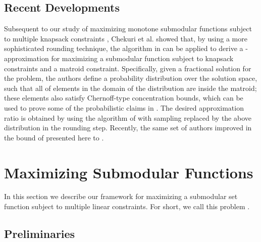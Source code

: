 \documentclass[11pt]{article}
\newcommand{\comment}[1]{}
\begin{document}
{\subsection{Recent Developments}

Subsequent to our study of maximizing monotone submodular
functions subject to multiple knapsack constraints \cite{KST09},
Chekuri et al. \cite{CVZ10}
showed that, by using a more
sophisticated rounding technique,
the algorithm in
\cite{KST09} can be applied to derive a
-approximation for
maximizing a submodular function subject to  knapsack
constraints and a matroid constraint.
Specifically, given a fractional solution for the problem, the
authors
define a probability distribution over the solution space, such
that all of elements in the domain of the distribution are inside
the matroid; these elements also satisfy Chernoff-type
concentration bounds, which can be used to prove some of the
probabilistic claims in \cite{KST09}.
The desired approximation ratio is obtained by using the algorithm
of \cite{KST09} with sampling replaced by the above distribution
in the rounding step.
Recently, the same set of authors improved in \cite{CVZ10a} the
bound of  presented here to .


\comment{
 In~\cite{CVZ10} Chekuri, Vondr\'{a}k and Zenklusen
presented a -approximation algorithm for monotone
maximization subject to  knapsack constraints and a matroid
constraint. Their main tool was to provide a distribution (given a
fractional solution), such that every element in the
distribution's domain is inside the matroid, and also maintains a
Chernoff-type concentration bounds which can be used to prove our
probabilistic claims. By applying this distribution over our
algorithm (while referring to \cite{KST09}), instead of a
sampling, the desired approximation ratio was attained. }


\section{Maximizing Submodular Functions}


\label{sec:randomized_mcmb}

In this section we describe our framework for maximizing a
submodular set function subject to multiple linear constraints.
For short, we call this problem .

\subsection{Preliminaries}
\label{sec:prel}

}
\end{document}
